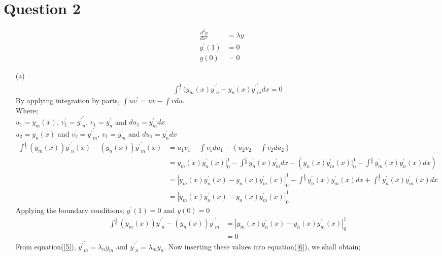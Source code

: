 \documentclass[12pt,a4paper]{article}
\begin{document}
\section*{Question 2}
\begin{align}
\frac{d^{2}y}{dx^{2}}&=\lambda y \label{5}\\ 
y^{\prime}(1)&=0\\ 
y(0)&=0
\end{align}
\begin{itemize}
	\item [(a)] 
	\begin{align}
	\int^{1}\limits_{0}(y_{m}(x){y^{\prime}}^{\prime}_{n}-y_{n}(x){y^{\prime}}^{\prime}_{m}dx=0 \label{6}
	\end{align}
By applying integration by parts, $\int uv^{\prime}=uv-\int v du$.\\
Where;\\
$u_{1}=y_{m}(x)$, $v^{\prime}_{1}={y^{\prime}}^{\prime}_{n}$, $v_{1}=y^{\prime}_{n}$ and $du_{1}=y^{\prime}_{m}dx$  \\
$u_{2}=y_{n}(x)$ and $v^{\prime}_{2}={y^{\prime}}^{\prime}_{m}$, $v_{1}=y^{\prime}_{m}$ and $du_{1}=y^{\prime}_{n}dx$
\begin{align*}
\int^{1}\limits_{0}(y_{m}(x)){y^{\prime}}^{\prime}_{n}(x)-(y_{n}(x)){y^{\prime}}^{\prime}_{m}(x)&=u_{1}v_{1}-\int v_{1} du_{1}- (u_{2}v_{2}-\int v_{2} du_{2})\\
&=y_{m}(x)y^{\prime}_{n}(x)|^{1}_{0}-\int^{1}\limits_{0}y^{\prime}_{n}(x)y^{\prime}_{m}dx-(y_{n}(x)y^{\prime}_{m}(x)|^{1}_{0}-\int^{1}\limits_{0}y^{\prime}_{m}(x)y^{\prime}_{n}(x)dx)\\
&=|y_{m}(x)y^{\prime}_{n}(x)-y_{n}(x)y^{\prime}_{m}(x)|^{1}_{0}-\int^{1}\limits_{0}y^{\prime}_{n}(x)y^{\prime}_{m}(x)dx+\int^{1}\limits_{0}y^{\prime}_{n}(x)y^{\prime}_{m}(x)dx\\
&=|y_{m}(x)y^{\prime}_{n}(x)-y_{n}(x)y^{\prime}_{m}(x)|^{1}_{0}
\end{align*}
Applying the boundary conditions; $y^{\prime}(1)=0$ and $y(0)=0$ 
\begin{align*}
\int^{1}\limits_{0}(y_{m}(x)){y^{\prime}}^{\prime}_{n}-(y_{n}(x)){y^{\prime}}^{\prime}_{m}&=|y_{m}(x)y^{\prime}_{n}(x)-y_{n}(x)y^{\prime}_{m}(x)|^{1}_{0}\\
&=0
\end{align*}
From equation(\ref{5}), ${y^{\prime}}^{\prime}_{m}=\lambda_{n}y_{m}$ and ${y^{\prime}}^{\prime}_{n}=\lambda_{m}y_{n}$. Now inserting these values into equation(\ref{6}), we shall obtain;
\begin{align}

\end{align}
\end{itemize}
\end{document}
